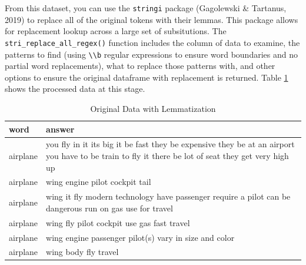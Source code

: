 \documentclass[man]{apa6}
\newenvironment{Shaded}{\begin{snugshade}}{\end{snugshade}}
\newcommand{\CharTok}[1]{\textcolor[rgb]{0.31,0.60,0.02}{#1}}
\newcommand{\CommentTok}[1]{\textcolor[rgb]{0.56,0.35,0.01}{\textit{#1}}}
\newcommand{\DataTypeTok}[1]{\textcolor[rgb]{0.13,0.29,0.53}{#1}}
\newcommand{\KeywordTok}[1]{\textcolor[rgb]{0.13,0.29,0.53}{\textbf{#1}}}
\newcommand{\NormalTok}[1]{#1}
\newcommand{\OperatorTok}[1]{\textcolor[rgb]{0.81,0.36,0.00}{\textbf{#1}}}
\newcommand{\OtherTok}[1]{\textcolor[rgb]{0.56,0.35,0.01}{#1}}
\newcommand{\StringTok}[1]{\textcolor[rgb]{0.31,0.60,0.02}{#1}}
\begin{document}
From this dataset, you can use the \texttt{stringi} package (Gagolewski \& Tartanus, 2019) to replace all of the original tokens with their lemmas. This package allows for replacement lookup across a large set of subsitutions. The \texttt{stri\_replace\_all\_regex()} function includes the column of data to examine, the patterns to find (using \texttt{\textbackslash{}\textbackslash{}b} regular expressions to ensure word boundaries and no partial word replacements), what to replace those patterns with, and other options to ensure the original dataframe with replacement is returned. Table \ref{tab:tab3} shows the processed data at this stage.

\scriptsize

\begin{Shaded}
\end{Shaded}

\normalsize

\begin{table}[t]

\caption{\label{tab:tab3}Original Data with Lemmatization}
\centering
\begin{tabular}{l>{\raggedright\arraybackslash}p{30em}}
\toprule
word & answer\\
\midrule
airplane & you fly in it  its big  it be fast  they be expensive  they be at an airport  you have to be train to fly it  there be lot of seat  they get very high up\\
airplane & wing engine pilot cockpit tail\\
airplane & wing  it fly  modern technology  have passenger  require a pilot  can be dangerous  run on gas  use for travel\\
airplane & wing  fly  pilot  cockpit  use gas  fast travel\\
airplane & wing  engine  passenger  pilot(s)  vary in size and color\\
\addlinespace
airplane & wing  body  fly  travel\\
\bottomrule
\end{tabular}
\end{table}
\end{document}

